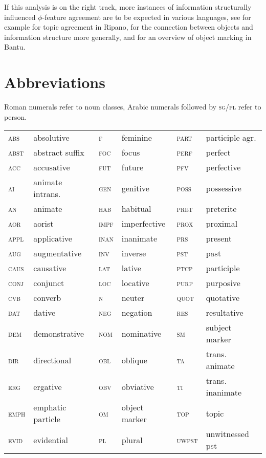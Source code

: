 \documentclass[output=paper
,modfonts
,nonflat]{langsci/langscibook}
\begin{document}
If this analysis is on the right track, more instances of information structurally influenced $ \phi $-feature agreement are to be expected in various languages, see for example  for topic agreement in Ripano, \citet{Dalrymple_Nikolaeva2011} for the connection between objects and information structure more generally, and \citet{Van_der_Wal2015,chapters/07-van-der-wal} for an overview of object marking in Bantu.

\section*{Abbreviations}
Roman numerals refer to noun classes, Arabic numerals followed by \textsc{sg/pl} refer to person.
\begin{table}
	\begin{tabular}{llllll} 
	\textsc{abs} 	& absolutive 		& 	\textsc{f} 	& feminine 	& \textsc{part}	& participle agr.\\
	\textsc{abst} 	& abstract suffix	& \textsc{foc} 	& focus		& \textsc{perf} & perfect\\
	\textsc{acc} 	& accusative 		& \textsc{fut} 	& future	& \textsc{pfv} 	& perfective\\
	\textsc{ai} 	& animate intrans. 	& \textsc{gen} 	& genitive  & \textsc{poss} & possessive\\
	\textsc{an} 	& animate 			& \textsc{hab} 	& habitual		& \textsc{pret} & preterite\\
	\textsc{aor} 	& aorist 			& \textsc{impf} & imperfective	& \textsc{prox} & proximal\\
	\textsc{appl} 	& applicative 		& \textsc{inan} & inanimate	& \textsc{prs} 	& present\\
	\textsc{aug} 	& augmentative 		& \textsc{inv} 	& inverse	& \textsc{pst} 	& past\\
	\textsc{caus} 	& causative 		& \textsc{lat} 	& lative 	& \textsc{ptcp} & participle\\
	\textsc{conj} 	& conjunct 			& \textsc{loc} 	& locative	& \textsc{purp} & purposive\\
	\textsc{cvb} 	& converb 			& \textsc{n} 	& neuter	& \textsc{quot} & quotative\\
	\textsc{dat} 	& dative 			& \textsc{neg} 	& negation	& \textsc{res} 	& resultative\\
	\textsc{dem} 	& demonstrative 	& \textsc{nom} 	& nominative & \textsc{sm} 	& subject marker\\
	\textsc{dir} 	& directional 		& \textsc{obl} 	& oblique	& \textsc{ta} 	& trans. animate\\
	\textsc{erg} 	& ergative 			& \textsc{obv} 	& obviative	& \textsc{ti} 	& trans. inanimate\\
	\textsc{emph} 	& emphatic particle & \textsc{om} 	& object marker	& \textsc{top} & topic\\
	\textsc{evid} 	& evidential 		& \textsc{pl} 	& plural	& \textsc{uwpst} & unwitnessed pst		
	\end{tabular}		
\end{table}
\end{document}
